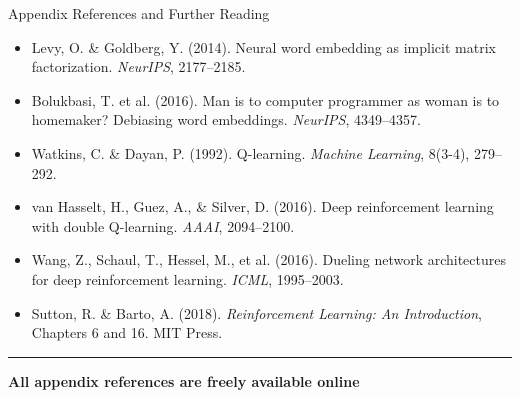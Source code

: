 \documentclass[8pt,aspectratio=169]{beamer}
\newcommand{\bottomnote}[1]{%
\vfill
\vspace{-2mm}
\textcolor{mllavender2}{\rule{\textwidth}{0.4pt}}
\vspace{1mm}
\footnotesize
\textbf{#1}
}
\begin{document}
\begin{frame}[t]{Appendix References and Further Reading}
\small
\begin{itemize}
\item Levy, O. \& Goldberg, Y. (2014). Neural word embedding as implicit matrix factorization. \textit{NeurIPS}, 2177--2185.
\item Bolukbasi, T. et al. (2016). Man is to computer programmer as woman is to homemaker? Debiasing word embeddings. \textit{NeurIPS}, 4349--4357.
\item Watkins, C. \& Dayan, P. (1992). Q-learning. \textit{Machine Learning}, 8(3-4), 279--292.
\item van Hasselt, H., Guez, A., \& Silver, D. (2016). Deep reinforcement learning with double Q-learning. \textit{AAAI}, 2094--2100.
\item Wang, Z., Schaul, T., Hessel, M., et al. (2016). Dueling network architectures for deep reinforcement learning. \textit{ICML}, 1995--2003.
\item Sutton, R. \& Barto, A. (2018). \textit{Reinforcement Learning: An Introduction}, Chapters 6 and 16. MIT Press.
\end{itemize}
\bottomnote{All appendix references are freely available online}
\end{frame}
\end{document}
